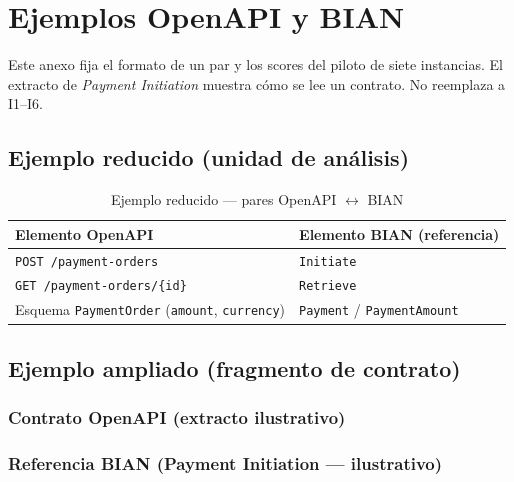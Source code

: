 \chapter{Ejemplos OpenAPI y BIAN}
\label{anexo:f}

Este anexo fija el formato de un par y los scores del piloto de siete instancias. El extracto
de \textit{Payment Initiation} muestra cómo se lee un contrato. No reemplaza a I1--I6.

\section{Ejemplo reducido (unidad de análisis)}

\begin{table}[H]
  \centering
  \caption{Ejemplo reducido — pares OpenAPI $\leftrightarrow$ BIAN}
  \label{tab:anexo-f-reducido}
  \small
  \begin{tabular}{@{}p{}p{}@{}}
    \toprule
    \textbf{Elemento OpenAPI} & \textbf{Elemento BIAN (referencia)} \\
    \midrule
    \texttt{POST /payment-orders} & \Behavior{} \texttt{Initiate} \\
    \texttt{GET /payment-orders/\{id\}} & \Behavior{} \texttt{Retrieve} \\
    Esquema \texttt{PaymentOrder} (\texttt{amount}, \texttt{currency}) &
    \BusinessObject{} \texttt{Payment} / \texttt{PaymentAmount} \\
    \bottomrule
  \end{tabular}
\end{table}

\section{Ejemplo ampliado (fragmento de contrato)}

\subsection{Contrato OpenAPI (extracto ilustrativo)}



\subsection{Referencia BIAN (Payment Initiation — ilustrativo)}

